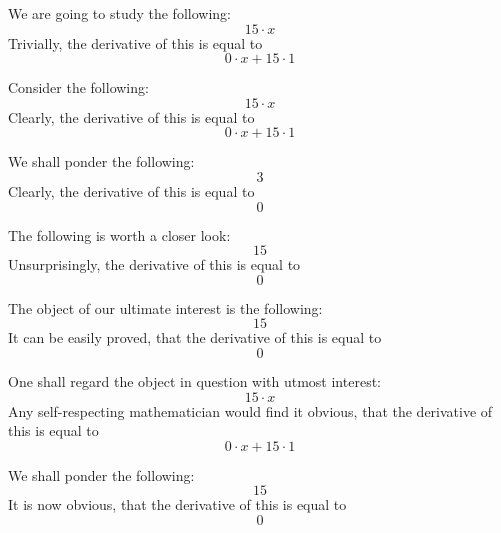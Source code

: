 \documentclass{article}
\begin{document}
We are going to study the following:
\begin{equation}
15 \cdot x 
\end{equation}
Trivially, the derivative of this is equal to
\begin{equation}
0 \cdot x + 15 \cdot 1 
\end{equation}

Consider the following:
\begin{equation}
15 \cdot x 
\end{equation}
Clearly, the derivative of this is equal to
\begin{equation}
0 \cdot x + 15 \cdot 1 
\end{equation}

We shall ponder the following:
\begin{equation}
3 
\end{equation}
Clearly, the derivative of this is equal to
\begin{equation}
0 
\end{equation}

The following is worth a closer look:
\begin{equation}
15 
\end{equation}
Unsurprisingly, the derivative of this is equal to
\begin{equation}
0 
\end{equation}

The object of our ultimate interest is the following:
\begin{equation}
15 
\end{equation}
It can be easily proved, that the derivative of this is equal to
\begin{equation}
0 
\end{equation}

One shall regard the object in question with utmost interest:
\begin{equation}
15 \cdot x 
\end{equation}
Any self-respecting mathematician would find it obvious, that the derivative of this is equal to
\begin{equation}
0 \cdot x + 15 \cdot 1 
\end{equation}

We shall ponder the following:
\begin{equation}
15 
\end{equation}
It is now obvious, that the derivative of this is equal to
\begin{equation}
0 
\end{equation}
\end{document}
